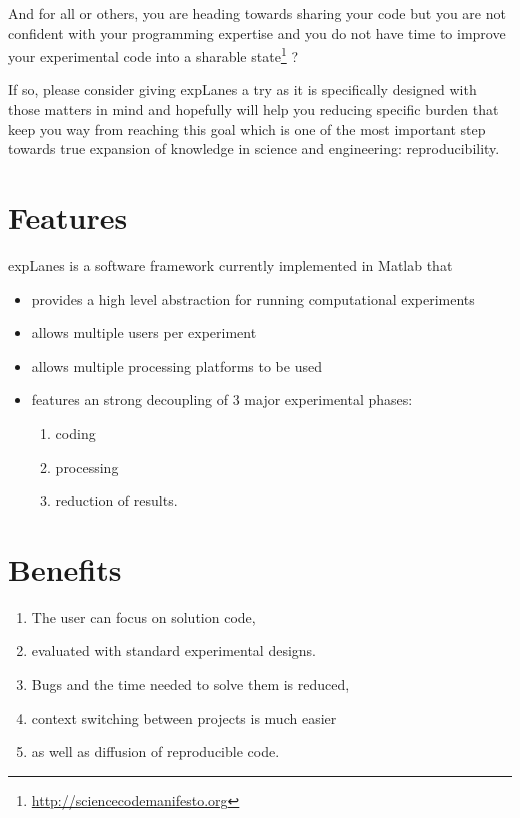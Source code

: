 \documentclass[a4paper,fleqn]{tufte-handout}
\newcommand{\explanes}{\textsf{expLanes} }
\begin{document}
And for all or others, you are heading towards sharing your code but you are not confident with your programming expertise and you do not have time to improve your experimental code into a sharable state\footnote{\url{http://sciencecodemanifesto.org}} ?

If so, please consider giving \explanes a try as it is specifically designed with those matters in mind and hopefully will help you reducing specific burden that keep you way from reaching this goal which is one of the most important step towards true expansion of knowledge in science and engineering: reproducibility\cite{science, sp}.

\section{Features}

\explanes is a software framework currently implemented in Matlab that 
\begin{itemize}
\item provides a high level abstraction for running computational experiments
\item allows multiple users per experiment
\item allows multiple processing platforms to be used
\item features an strong decoupling of 3 major experimental phases: 
\begin{enumerate}
\item coding
\item processing
\item reduction of results.
\end{enumerate}
\end{itemize}

\section{Benefits} 
\begin{enumerate}
\item The user can focus on solution code,
\item evaluated with standard experimental designs.
\item Bugs and the time needed to solve them is reduced,
\item context switching between projects is much easier
\item as well as diffusion of reproducible code.
\end{enumerate}
\end{document}
